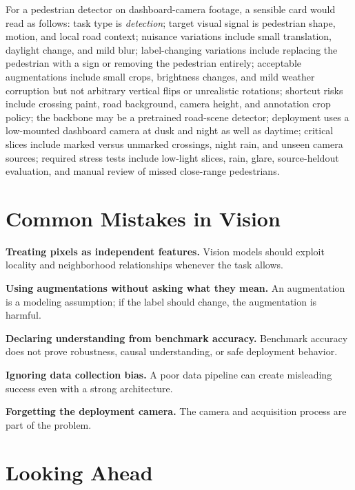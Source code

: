 \begin{example}
For a pedestrian detector on dashboard-camera footage, a sensible card would read as follows: task type is \emph{detection}; target visual signal is pedestrian shape, motion, and local road context; nuisance variations include small translation, daylight change, and mild blur; label-changing variations include replacing the pedestrian with a sign or removing the pedestrian entirely; acceptable augmentations include small crops, brightness changes, and mild weather corruption but not arbitrary vertical flips or unrealistic rotations; shortcut risks include crossing paint, road background, camera height, and annotation crop policy; the backbone may be a pretrained road-scene detector; deployment uses a low-mounted dashboard camera at dusk and night as well as daytime; critical slices include marked versus unmarked crossings, night rain, and unseen camera sources; required stress tests include low-light slices, rain, glare, source-heldout evaluation, and manual review of missed close-range pedestrians.
\end{example}

\section{Common Mistakes in Vision}

\begin{mistakebox}
\item \textbf{Treating pixels as independent features.} Vision models should exploit locality and neighborhood relationships whenever the task allows.
\item \textbf{Using augmentations without asking what they mean.} An augmentation is a modeling assumption; if the label should change, the augmentation is harmful.
\item \textbf{Declaring understanding from benchmark accuracy.} Benchmark accuracy does not prove robustness, causal understanding, or safe deployment behavior.
\item \textbf{Ignoring data collection bias.} A poor data pipeline can create misleading success even with a strong architecture.
\item \textbf{Forgetting the deployment camera.} The camera and acquisition process are part of the problem.
\end{mistakebox}

\section{Looking Ahead}

